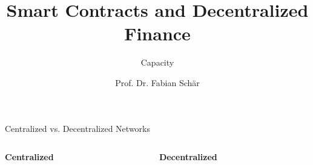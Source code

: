 \documentclass[]{beamer}
\title{Smart Contracts and Decentralized Finance}
\subtitle{Capacity}
\author{Prof. Dr. Fabian Schär}
\institute{University of Basel}
\begin{document}
\thispagestyle{empty}
\begin{frame}[noframenumbering]
	\titlepage
\end{frame}


\begin{frame}{Centralized vs. Decentralized Networks}

	\begin{columns}[T]
		\begin{column}{0.5\textwidth}
		\center
			\begin{tikzpicture}[scale=0.56, every node/.style={scale=0.63}]
				
			\end{tikzpicture}
		\end{column}
		\begin{column}{0.5\textwidth}
		\center
			\begin{tikzpicture}[scale=0.63, every node/.style={scale=0.63}]
				
			\end{tikzpicture}
		\end{column}
	\end{columns}
	
	\vspace{1em}
	\begin{columns}[T]
		\begin{column}{0.5\textwidth}
		\center
		\textbf{Centralized}
		\end{column}
		\begin{column}{0.5\textwidth}
		\center
		\textbf{Decentralized}
		\end{column}
		
	\end{columns}
		
	
\end{frame}
\end{document}
